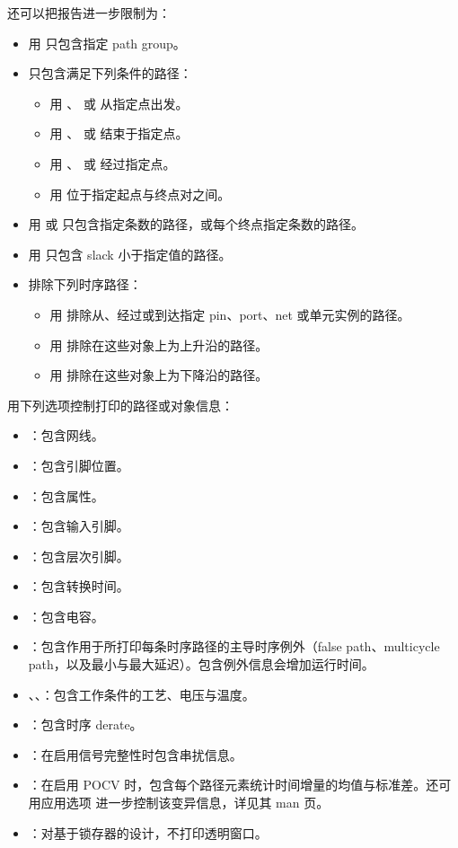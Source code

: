 还可以把报告进一步限制为：
\begin{itemize}
  \item 用  只包含指定 path group。
  \item 只包含满足下列条件的路径：
  \begin{itemize}
    \item 用 、 或  从指定点出发。
    \item 用 、 或  结束于指定点。
    \item 用 、 或  经过指定点。
    \item 用  位于指定起点与终点对之间。
  \end{itemize}
  \item 用  或  只包含指定条数的路径，或每个终点指定条数的路径。
  \item 用  只包含 slack 小于指定值的路径。
  \item 排除下列时序路径：
  \begin{itemize}
    \item 用  排除从、经过或到达指定 pin、port、net 或单元实例的路径。
    \item 用  排除在这些对象上为上升沿的路径。
    \item 用  排除在这些对象上为下降沿的路径。
  \end{itemize}
\end{itemize}

用下列选项控制打印的路径或对象信息：
\begin{itemize}
  \item {}：包含网线。
  \item {}：包含引脚位置。
  \item {}：包含属性。
  \item {}：包含输入引脚。
  \item {}：包含层次引脚。
  \item {}：包含转换时间。
  \item {}：包含电容。
  \item {}：包含作用于所打印每条时序路径的主导时序例外（false path、multicycle path，以及最小与最大延迟）。包含例外信息会增加运行时间。
  \item {}、、：包含工作条件的工艺、电压与温度。
  \item {}：包含时序 derate。
  \item {}：在启用信号完整性时包含串扰信息。
  \item {}：在启用 POCV 时，包含每个路径元素统计时间增量的均值与标准差。还可用应用选项  进一步控制该变异信息，详见其 man 页。
  \item {}：对基于锁存器的设计，不打印透明窗口。
\end{itemize}

